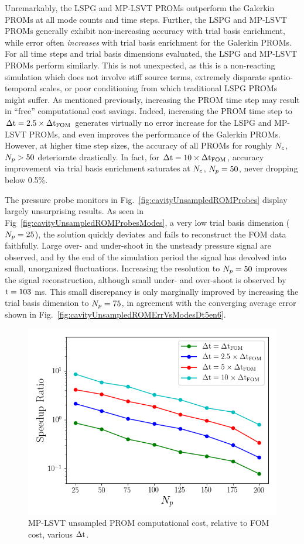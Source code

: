 Unremarkably, the LSPG and MP-LSVT PROMs outperform the Galerkin PROMs at all mode counts and time steps. Further, the LSPG and MP-LSVT PROMs generally exhibit non-increasing accuracy with trial basis enrichment, while error often \textit{increases} with trial basis enrichment for the Galerkin PROMs. For all time steps and trial basis dimensions evaluated, the LSPG and MP-LSVT PROMs perform similarly. This is not unexpected, as this is a non-reacting simulation which does not involve stiff source terms, extremely disparate spatio-temporal scales, or poor conditioning from which traditional LSPG PROMs might suffer. As mentioned previously, increasing the PROM time step may result in ``free'' computational cost savings. Indeed, increasing the PROM time step to $\Delta \text{t} = 2.5 \times \Delta \text{t}_{\text{FOM}}$ generates virtually no error increase for the LSPG and MP-LSVT PROMs, and even improves the performance of the Galerkin PROMs. However, at higher time step sizes, the accuracy of all PROMs for roughly $N_c$, $N_p > 50$ deteriorate drastically. In fact, for $\Delta \text{t} = 10 \times \Delta \text{t}_{\text{FOM}}$, accuracy improvement via trial basis enrichment saturates at $N_c$, $N_p = 50$, never dropping below 0.5\%.

The pressure probe monitors in Fig.~\ref{fig:cavityUnsampledROMProbes} display largely unsurprising results. As seen in Fig~\ref{fig:cavityUnsampledROMProbesModes}, a very low trial basis dimension ($N_p = 25$), the solution quickly deviates and fails to reconstruct the FOM data faithfully. Large over- and under-shoot in the unsteady pressure signal are observed, and by the end of the simulation period the signal has devolved into small, unorganized fluctuations. Increasing the resolution to $N_p = 50$ improves the signal reconstruction, although small under- and over-shoot is observed by $\text{t} = 103$ ms. This small discrepancy is only marginally improved by increasing the trial basis dimension to $N_p = 75$, in agreement with the converging average error shown in Fig.~\ref{fig:cavityUnsampledROMErrVsModesDt5en6}.

\begin{figure}
    \centering
    \includegraphics[width=0.7\linewidth]{Chapters/HPROMResults/Images/cavity/unsampled/unsampled_modeStudy_time_calcAndMPI.png}
    \caption{\label{fig:cavityUnsampledCost}MP-LSVT unsampled PROM computational cost, relative to FOM cost, various $\Delta \text{t}$.}
\end{figure}

